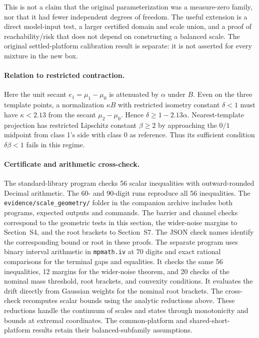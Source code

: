 This is not a claim that the original parameterization was a measure-zero
family, nor that it had fewer independent degrees of freedom. The useful
extension is a direct model-input test, a larger certified domain and scale
union, and a proof of reachability/risk that does not depend on constructing a
balanced scale. The original settled-platform calibration result is separate:
it is not asserted for every mixture in the new box.


\paragraph{Relation to restricted contraction.}
Here the unit secant $e_1=\mu_1-\mu_0$ is attenuated by $\alpha$ under $B$.
Even on the three template points, a normalization $\kappa B$ with
restricted isometry constant $\delta<1$ must have $\kappa<2.13$ from
the secant $\mu_2-\mu_0$. Hence $\delta\ge1-2.13\alpha$.
Nearest-template projection has restricted Lipschitz constant
$\beta\ge2$ by approaching the $0/1$ midpoint from class 1's side with
class 0 as reference. Thus its sufficient condition $\delta\beta<1$
fails in this regime.

\paragraph{Certificate and arithmetic cross-check.}
The standard-library program
checks 56 scalar inequalities with outward-rounded Decimal arithmetic.
The 60- and 90-digit runs reproduce all 56 inequalities.
The \texttt{evidence/scale\_geometry/} folder in the companion archive
includes both programs, expected outputs and commands. The barrier
and channel checks correspond to the geometric tests in this section,
the wider-noise margins to Section~S4, and the root brackets to
Section~S7. The JSON check names identify the corresponding bound
or root in these proofs. The separate
program 
uses binary interval arithmetic in \texttt{mpmath.iv} at 70 digits
and exact rational comparisons for the terminal gaps and equalities.
It checks the same 56 inequalities, 12 margins for the wider-noise
theorem, and 20 checks of the nominal mass threshold, root brackets,
and convexity conditions. It evaluates the drift directly from
Gaussian weights for the nominal root brackets.
The cross-check recomputes scalar bounds using the analytic reductions
above. These reductions handle the continuum of scales and states
through monotonicity and bounds at extremal coordinates.
The common-platform and shared-short-platform results retain their
balanced-subfamily assumptions.
